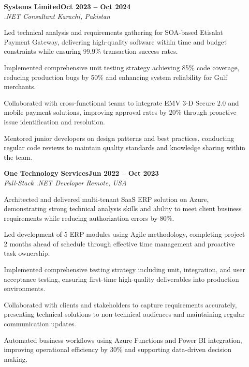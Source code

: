 \documentclass[letterpaper,10pt]{article}
\newcommand{\headingBf}[2]{
  \hspace{10pt}\textbf{#1}\hfill\textbf{#2}\\
}
\newcommand{\headingIt}[2]{
  \hspace{10pt}\textit{#1}\hfill\textit{#2}\\
}
\newenvironment{resume_list}{
  \vspace{-7pt}
  \begin{itemize}[itemsep=-2px, parsep=1pt, leftmargin=30pt]
}{
  \end{itemize}
}
\begin{document}
\headingBf{Systems Limited}{Oct 2023 -- Oct 2024}
\headingIt{.NET Consultant \hfill Karachi, Pakistan}{}
\begin{resume_list}
    \item Led technical analysis and requirements gathering for SOA-based Etisalat Payment Gateway, delivering high-quality software within time and budget constraints while ensuring 99.9\% transaction success rates.
    \item Implemented comprehensive unit testing strategy achieving 85\% code coverage, reducing production bugs by 50\% and enhancing system reliability for Gulf merchants.
    \item Collaborated with cross-functional teams to integrate EMV 3-D Secure 2.0 and mobile payment solutions, improving approval rates by 20\% through proactive issue identification and resolution.
    \item Mentored junior developers on design patterns and best practices, conducting regular code reviews to maintain quality standards and knowledge sharing within the team.
\end{resume_list}

\headingBf{One Technology Services}{Jun 2022 -- Oct 2023}
\headingIt{Full-Stack .NET Developer \hfill Remote, USA}{}
\begin{resume_list}
    \item Architected and delivered multi-tenant SaaS ERP solution on Azure, demonstrating strong technical analysis skills and ability to meet client business requirements while reducing authorization errors by 80\%.
    \item Led development of 5 ERP modules using Agile methodology, completing project 2 months ahead of schedule through effective time management and proactive task ownership.
    \item Implemented comprehensive testing strategy including unit, integration, and user acceptance testing, ensuring first-time high-quality deliverables into production environments.
    \item Collaborated with clients and stakeholders to capture requirements accurately, presenting technical solutions to non-technical audiences and maintaining regular communication updates.
    \item Automated business workflows using Azure Functions and Power BI integration, improving operational efficiency by 30\% and supporting data-driven decision making.
\end{resume_list}
\end{document}
